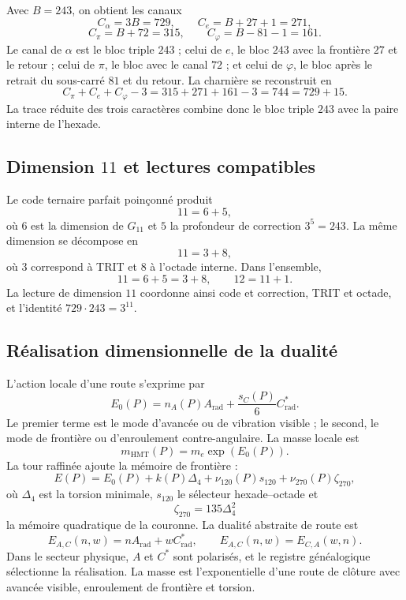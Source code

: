 Avec \(B=243\), on obtient les canaux
\[
C_\alpha=3B=729,
\qquad
C_e=B+27+1=271,
\]
\[
C_\pi=B+72=315,
\qquad
C_\varphi=B-81-1=161.
\]
Le canal de \(\alpha\) est le bloc triple \(243\) ; celui de \(e\), le bloc
\(243\) avec la frontière \(27\) et le retour ; celui de \(\pi\), le bloc avec le
canal \(72\) ; et celui de \(\varphi\), le bloc après le retrait du
sous-carré \(81\) et du retour.
La charnière se reconstruit en
\[
C_\pi+C_e+C_\varphi-3
=315+271+161-3
=744
=729+15.
\]
La trace réduite des trois caractères combine donc le bloc triple
\(243\) avec la paire interne de l'hexade.

\subsection{Dimension \texorpdfstring{\(11\)}{11} et lectures compatibles}

Le code ternaire parfait poinçonné produit
\[
11=6+5,
\]
où \(6\) est la dimension de \(G_{11}\) et \(5\) la profondeur de
correction \(3^5=243\). La même dimension se décompose en
\[
11=3+8,
\]
où \(3\) correspond à TRIT et \(8\) à l'octade interne. Dans l'ensemble,
\[
11=6+5=3+8,
\qquad
12=11+1.
\]
La lecture de dimension \(11\) coordonne ainsi code et correction, TRIT et
octade, et l'identité \(729\cdot243=3^{11}\).

\subsection{Réalisation dimensionnelle de la dualité}

L'action locale d'une route s'exprime par
\[
E_0(P)=n_A(P)A_{\mathrm{rad}}
+\frac{s_C(P)}{6}C^*_{\mathrm{rad}}.
\]
Le premier terme est le mode d'avancée ou de vibration visible ; le second, le
mode de frontière ou d'enroulement contre-angulaire. La masse locale est
\[
m_{\mathrm{HMT}}(P)=m_e\exp(E_0(P)).
\]
La tour raffinée ajoute la mémoire de frontière :
\[
E(P)=E_0(P)+k(P)\Delta_4
+\nu_{120}(P)s_{120}
+\nu_{270}(P)\zeta_{270},
\]
où \(\Delta_4\) est la torsion minimale, \(s_{120}\) le sélecteur
hexade--octade et
\[
\zeta_{270}=135\Delta_4^2
\]
la mémoire quadratique de la couronne. La dualité abstraite de route est
\[
E_{A,C}(n,w)=nA_{\mathrm{rad}}+wC^*_{\mathrm{rad}},
\qquad
E_{A,C}(n,w)=E_{C,A}(w,n).
\]
Dans le secteur physique, \(A\) et \(C^*\) sont polarisés, et le registre généalogique sélectionne
la réalisation. La masse est l'exponentielle d'une route de clôture avec avancée
visible, enroulement de frontière et torsion.

